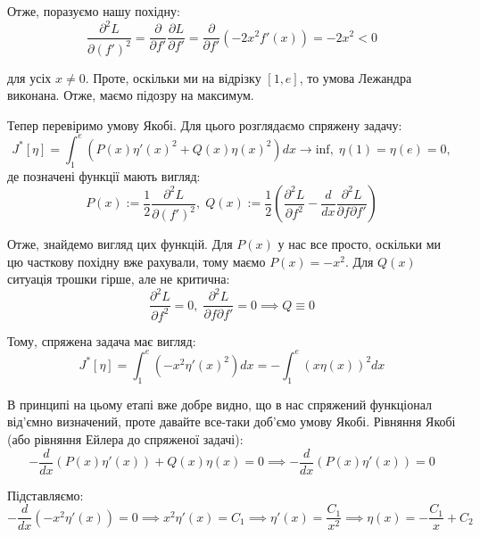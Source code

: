 \documentclass[14pt]{extarticle}
\newcommand{\<}{\langle}
\renewcommand{\>}{\rangle}
\theoremstyle{mystyle}{\newtheorem{definition}{Definition}[section]}
\theoremstyle{mystyle}{\newtheorem{proposition}[definition]{Proposition}}
\theoremstyle{mystyle}{\newtheorem{theorem}[definition]{Theorem}}
\theoremstyle{mystyle}{\newtheorem{lemma}[definition]{Lemma}}
\theoremstyle{mystyle}{\newtheorem{corollary}[definition]{Corollary}}
\theoremstyle{mystyle}{\newtheorem*{remark}{Remark}}
\theoremstyle{mystyle}{\newtheorem*{remarks}{Remarks}}
\theoremstyle{mystyle}{\newtheorem*{example}{Example}}
\theoremstyle{mystyle}{\newtheorem*{examples}{Examples}}
\theoremstyle{definition}{\newtheorem*{exercise}{Exercise}}
\theoremstyle{cstyle}{\newtheorem*{cthm}{}}
\theoremstyle{warn}
\begin{document}
Отже, поразуємо нашу похідну:
\begin{equation}
    \frac{\partial^2 L}{\partial (f')^2} = \frac{\partial }{\partial f'} \frac{\partial L}{\partial f'} = \frac{\partial}{\partial f'}(-2x^2f'(x)) = -2x^2 < 0
\end{equation}

для усіх $x \neq 0$. Проте, оскільки ми на відрізку $[1,e]$, то умова Лежандра виконана. Отже, маємо підозру на максимум.

Тепер перевіримо умову Якобі. Для цього розглядаємо спряжену задачу:
\begin{equation}
    J^*[\eta] = \int_1^e \left(P(x)\eta'(x)^2 + Q(x)\eta(x)^2\right)dx \to \text{inf}, \; \eta(1)=\eta(e)=0,
\end{equation}
де позначені функції мають вигляд:
\begin{equation}
    P(x) := \frac{1}{2}\frac{\partial^2 L}{\partial (f')^2}, \; Q(x) := \frac{1}{2}\left(\frac{\partial^2 L}{\partial f^2} - \frac{d}{dx}\frac{\partial^2 L}{\partial f\partial f'}\right)
\end{equation} 

Отже, знайдемо вигляд цих функцій. Для $P(x)$ у нас все просто, оскільки ми цю часткову похідну вже рахували, тому маємо $P(x)=-x^2$. Для $Q(x)$ ситуація трошки гірше, але не критична:
\begin{equation}
    \frac{\partial^2 L}{\partial f^2} = 0, \; \frac{\partial^2 L}{\partial f\partial f'} = 0 \implies Q \equiv 0
\end{equation}

Тому, спряжена задача має вигляд:
\begin{equation}
    J^*[\eta] = \int_1^e (-x^2\eta'(x)^2)dx = -\int_1^e (x\eta(x))^2dx
\end{equation}

В принципі на цьому етапі вже добре видно, що в нас спряжений функціонал від'ємно визначений, проте давайте все-таки доб'ємо умову Якобі. Рівняння Якобі (або рівняння Ейлера до спряженої задачі):
\begin{equation}
    -\frac{d}{dx}(P(x)\eta'(x)) + Q(x)\eta(x) = 0 \implies -\frac{d}{dx}(P(x)\eta'(x)) = 0
\end{equation}

Підставляємо:
\begin{equation}
    -\frac{d}{dx}(-x^2\eta'(x)) = 0 \implies x^2\eta'(x) = C_1 \implies \eta'(x) = \frac{C_1}{x^2} \implies \eta(x) = -\frac{C_1}{x} + C_2
\end{equation}
\end{document}
